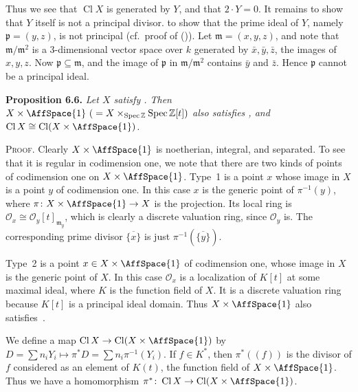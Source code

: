 {Thus we see that $\operatorname{Cl} X$ is generated by $Y$, and that $2\cdot Y=0$. It remains to show that $Y$ itself is not a principal divisor.  to show that the prime ideal of $Y$, namely $\mathfrak p=(y,z)$, is not principal (cf.\ proof of ()). Let $\mathfrak m=(x,y,z)$, and note that $\mathfrak m/\mathfrak m^2$ is a $3$-dimensional vector space over $k$ generated by $\bar x,\bar y,\bar z$, the images of $x,y,z$. Now $\mathfrak p\subseteq\mathfrak m$, and the image of $\mathfrak p$ in $\mathfrak m/\mathfrak m^2$ contains $\bar y$ and $\bar z$. Hence $\mathfrak p$ cannot be a principal ideal.

\medskip
\noindent\hypertarget{result-II-6.6}{}\textbf{Proposition 6.6.} \emph{Let $X$ satisfy . Then $X\times\AffSpace{1}\ ({}=X\times_{\operatorname{Spec}\mathbb Z}\operatorname{Spec}\mathbb Z[t])$ also satisfies , and $\operatorname{Cl} X\cong\operatorname{Cl}(X\times\AffSpace{1})$.}

\smallskip
\noindent\textsc{Proof.} Clearly $X\times\AffSpace{1}$ is noetherian, integral, and separated. To see that it is regular in codimension one, we note that there are two kinds of points of codimension one on $X\times\AffSpace{1}$. \hypertarget{type-II-6.6-1}{}Type~1 is a point $x$ whose image in $X$ is a point $y$ of codimension one. In this case $x$ is the generic point of $\pi^{-1}(y)$, where $\pi\colon X\times\AffSpace{1}\to X$ is the projection. Its local ring is $\mathcal O_x\cong\mathcal O_y[t]_{\mathfrak m_y}$, which is clearly a discrete valuation ring, since $\mathcal O_y$ is. The corresponding prime divisor $\overline{\{x\}}$ is just $\pi^{-1}(\overline{\{y\}})$.

\hypertarget{type-II-6.6-2}{}Type~2 is a point $x\in X\times\AffSpace{1}$ of codimension one, whose image in $X$ is the generic point of $X$. In this case $\mathcal O_x$ is a localization of $K[t]$ at some maximal ideal, where $K$ is the function field of $X$. It is a discrete valuation ring because $K[t]$ is a principal ideal domain. Thus $X\times\AffSpace{1}$ also satisfies~.

We define a map $\operatorname{Cl} X\to\operatorname{Cl}(X\times\AffSpace{1})$ by $D=\sum n_iY_i\mapsto\pi^*D=\sum n_i\pi^{-1}(Y_i)$. If $f\in K^*$, then $\pi^*((f))$ is the divisor of $f$ considered as an element of $K(t)$, the function field of $X\times\AffSpace{1}$. Thus we have a homomorphism $\pi^*\colon\operatorname{Cl} X\to\operatorname{Cl}(X\times\AffSpace{1})$.}
